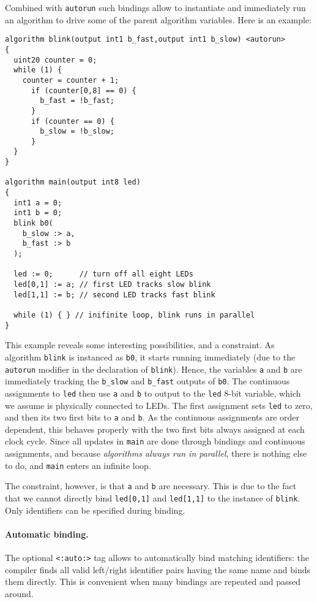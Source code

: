 \documentclass[a4]{article}
\begin{document}
Combined with \texttt{autorun} such bindings allow to instantiate and immediately run an algorithm to drive some of the parent algorithm variables. 
Here is an example:
%
\begin{verbatim}
algorithm blink(output int1 b_fast,output int1 b_slow) <autorun>
{
  uint20 counter = 0;
  while (1) {
    counter = counter + 1;
      if (counter[0,8] == 0) {
        b_fast = !b_fast;
      }
      if (counter == 0) {
        b_slow = !b_slow;
      }
  }
}

algorithm main(output int8 led)
{
  int1 a = 0;
  int1 b = 0;
  blink b0(
    b_slow :> a,
    b_fast :> b
  );

  led := 0;      // turn off all eight LEDs
  led[0,1] := a; // first LED tracks slow blink
  led[1,1] := b; // second LED tracks fast blink

  while (1) { } // inifinite loop, blink runs in parallel
}
\end{verbatim}
%
This example reveals some interesting possibilities, and a constraint.
As algorithm \texttt{blink} is instanced as \texttt{b0}, it starts running immediately (due to the \texttt{autorun} modifier in the declaration of \texttt{blink}). Hence, the variables \texttt{a} and \texttt{b}
are immediately tracking the \texttt{b\_slow} and \texttt{b\_fast} outputs of \texttt{b0}. The continuous assignments to \texttt{led} then use \texttt{a} and \texttt{b} to output to the \texttt{led} 8-bit variable, which we assume is physically connected to LEDs. The first assignment sets \texttt{led} to zero, and then its two first bits to \texttt{a} and \texttt{b}. As the continuous assignments are order dependent, this behaves properly with the two first bits always assigned at each clock cycle. Since all updates in \texttt{main} are done through bindings and continuous assignments, and because \textit{algorithms always run in parallel}, there is nothing else to do, and \texttt{main} enters an infinite loop.

The constraint, however, is that \texttt{a} and \texttt{b} are necessary. This is due to the fact that we cannot directly bind \texttt{led[0,1]} and \texttt{led[1,1]} to the instance of \texttt{blink}. Only identifiers can be specified during binding.

\paragraph{Automatic binding.}
The optional \texttt{<:auto:>} tag allows to automatically bind matching identifiers:
the compiler finds all valid left/right identifier pairs having the same name and
binds them directly. This is convenient when many bindings are repeated and passed
around. 
\end{document}
